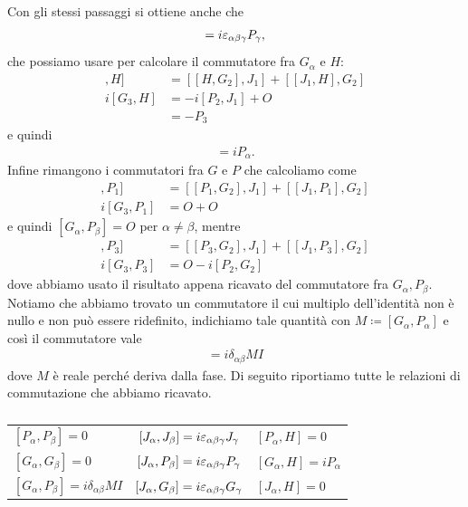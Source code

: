 Con gli stessi passaggi si ottiene anche che 
\begin{align*}
  [J_\alpha, P_\beta] = i \eps_{\alpha \beta \gamma} P_\gamma, 
\end{align*}
che possiamo usare per calcolare il commutatore fra $ G_\alpha $ e $ H $:
\begin{align*}
  [[J_1, G_2], H] &= [[H, G_2], J_1] + [[J_1, H], G_2]
  \\
  i[G_3, H] &= -i[P_2, J_1] + O 
  \\
  &= - P_3 
\end{align*}
e quindi 
\begin{align*}
  [G_\alpha, H] = i P_\alpha.
\end{align*}
Infine rimangono i commutatori fra $ G $ e $ P $ che calcoliamo come 
\begin{align*}
  [[J_1, G_2], P_1] &= [[P_1, G_2], J_1] + [[J_1, P_1], G_2]
  \\
  i[G_3, P_1] &= O + O 
\end{align*}
e quindi $ [G_\alpha, P_\beta] = O $ per $ \alpha \neq \beta $, mentre 
\begin{align*}
  [[J_1, G_2], P_3] &= [[P_3, G_2], J_1] + [[J_1, P_3], G_2]
  \\
  i[G_3, P_3] &= O -i [P_2, G_2]
\end{align*}
dove abbiamo usato il risultato appena ricavato del commutatore fra $ G_\alpha, P_\beta $. Notiamo che abbiamo trovato un commutatore il cui multiplo 
dell'identità non è nullo e non può essere ridefinito, indichiamo tale quantità con $ M \coloneq [G_\alpha, P_\alpha] $ e così il commutatore vale 
\begin{align*}
  [G_\alpha, P_\alpha] = i \delta_{\alpha \beta} M I
\end{align*}
dove $ M $ è reale perché deriva dalla fase. Di seguito riportiamo tutte le relazioni di commutazione che abbiamo ricavato.
\begin{table}[h]
  \centering
  \caption{}
  \begin{tabular}{lcl}
    $ [P_\alpha, P_\beta] = 0 $                           & $ [J_\alpha, J_\beta] = i \varepsilon_{\alpha \beta \gamma} J_\gamma $ & $ [P_\alpha, H] = 0 $ \\
    $ [G_\alpha, G_\beta] = 0 $                          & $ [J_\alpha, P_\beta] = i \varepsilon_{\alpha \beta \gamma} P_\gamma $ & $ [G_\alpha, H] = i P_\alpha $ \\
    $ [G_\alpha, P_\beta] = i \delta_{\alpha \beta} M I $ & $ [J_\alpha, G_\beta] = i \varepsilon_{\alpha \beta \gamma} G_\gamma $ & $ [J_\alpha, H] = 0 $ 
  \end{tabular}
\end{table}

